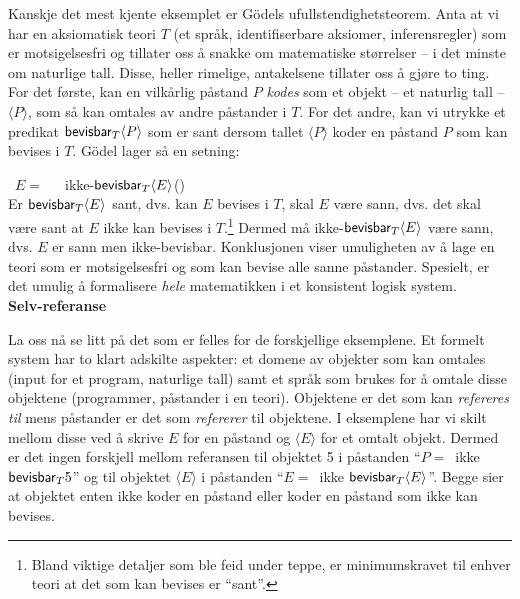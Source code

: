 \documentclass[10pt,twocolumn,leqno]{article}
\newcounter{EQ}
\newcommand{\equ}[1]{\refstepcounter{EQ}\vspace{.5ex}\par\noindent\ 
    \hfill #1\hfill{(\theEQ)}\\[.5ex]}
\newcommand{\<}{\langle}
\renewcommand{\>}{\rangle}
\begin{document}
Kanskje det mest kjente eksemplet
er G\"{o}dels ufullstendighetsteorem. 
Anta at vi har en aksiomatisk teori $T$ (et spr{\aa}k, identifiserbare aksiomer,
 inferensregler) som er motsigelsesfri og tillater oss 
{\aa} snakke om matematiske st{\o}rrelser -- i det minste om 
naturlige tall.
Disse, heller rimelige, antakelsene
tillater oss {\aa} gj{\o}re to ting. For det f{\o}rste, kan en
 vilk{\aa}rlig p{\aa}stand 
$P$ {\em kodes} som et objekt -- et naturlig tall -- $\<P\>$, 
som s{\aa} kan omtales av 
andre p{\aa}stander i $T$. For det andre, kan vi utrykke 
et predikat ${\sf bevisbar}_{T}\<P\>$ som er sant 
dersom tallet $\<P\>$ koder en p{\aa}stand $P$ som
kan bevises i $T$. 
G\"{o}del lager s{\aa} en setning:
\equ{$E=$\ \ \ ikke-${\sf bevisbar}_{T}\<E\>$}\label{pa:G}
Er ${\sf bevisbar}_{T}\<E\>$ sant, dvs. kan $E$ bevises i $T$, skal $E$ 
v{\ae}re sann, dvs. det skal 
v{\ae}re sant at $E$ ikke kan bevises i $T$.\footnote{Bland viktige 
detaljer som ble feid under teppe, er minimumskravet til enhver teori at 
det som kan bevises er ``sant''.}
Dermed m{\aa} ikke-${\sf bevisbar}_{T}\<E\>$ v{\ae}re sann,
dvs. $E$ er sann men ikke-bevisbar. Konklusjonen 
viser umuligheten av {\aa} lage en teori som er 
motsigelsesfri og som kan bevise alle sanne p{\aa}stander. Spesielt, er 
det umulig {\aa} formalisere {\em hele} matematikken i et konsistent
logisk system. \\[1.5ex]
%
{\bf Selv-referanse} %

La oss n{\aa} se litt p{\aa} det som er felles for de forskjellige 
eksemplene. Et formelt system har to klart adskilte aspekter: et domene av objekter 
som kan omtales (input for et program, naturlige tall) samt et 
spr{\aa}k som brukes for {\aa} omtale disse objektene (programmer, 
p{\aa}stander i en teori). Objektene er det som kan {\em refereres 
til} mens p{\aa}stander er det som {\em refererer} til objektene. 
I eksemplene har vi skilt mellom disse ved {\aa} skrive $E$ for en p{\aa}stand 
og $\<E\>$ for et omtalt objekt. 
Dermed er det ingen forskjell mellom referansen til objektet 5 i p{\aa}standen
``$P=$\ ikke ${\sf bevisbar}_{T}5$'' og til objektet $\<E\>$ i 
p{\aa}standen ``$E=$\ ikke ${\sf bevisbar}_{T}\<E\>$''. Begge sier at 
objektet enten ikke koder en p{\aa}stand eller koder en p{\aa}stand 
som ikke kan bevises. 
\end{document}
